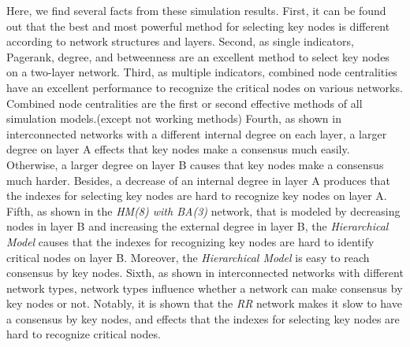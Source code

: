 Here, we find several facts from these simulation results. First, it can be found out that the best and most powerful method for selecting key nodes is different according to network structures and layers. Second, as single indicators, Pagerank, degree, and betweenness are an excellent method to select key nodes on a two-layer network. Third, as multiple indicators, combined node centralities have an excellent performance to recognize the critical nodes on various networks. Combined node centralities are the first or second effective methods of all simulation models.(except not working methods) Fourth, as shown in interconnected networks with a different internal degree on each layer, a larger degree on layer A effects that key nodes make a consensus much easily. Otherwise, a larger degree on layer B causes that key nodes make a consensus much harder. Besides, a decrease of an internal degree in layer A produces that the indexes for selecting key nodes are hard to recognize key nodes on layer A. Fifth, as shown in the \textit{HM(8) with BA(3)} network, that is modeled by decreasing nodes in layer B and increasing the external degree in layer B,  the \textit{Hierarchical Model} causes that the indexes for recognizing key nodes are hard to identify critical nodes on layer B.  Moreover, the \textit{Hierarchical Model} is easy to reach consensus by key nodes. Sixth, as shown in interconnected networks with different network types, network types influence whether a network can make consensus by key nodes or not. Notably, it is shown that the \textit{RR} network makes it slow to have a consensus by key nodes, and effects that the indexes for selecting key nodes are hard to recognize critical nodes. \\









